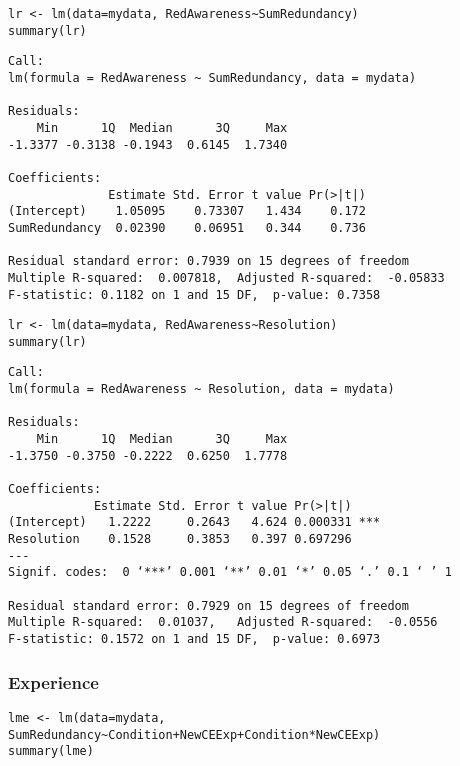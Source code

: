 \documentclass[10pt]{article}
\begin{document}
\begin{verbatim}
lr <- lm(data=mydata, RedAwareness~SumRedundancy)
summary(lr)
\end{verbatim}

\begin{verbatim}
Call:
lm(formula = RedAwareness ~ SumRedundancy, data = mydata)

Residuals:
    Min      1Q  Median      3Q     Max 
-1.3377 -0.3138 -0.1943  0.6145  1.7340 

Coefficients:
              Estimate Std. Error t value Pr(>|t|)
(Intercept)    1.05095    0.73307   1.434    0.172
SumRedundancy  0.02390    0.06951   0.344    0.736

Residual standard error: 0.7939 on 15 degrees of freedom
Multiple R-squared:  0.007818,	Adjusted R-squared:  -0.05833 
F-statistic: 0.1182 on 1 and 15 DF,  p-value: 0.7358
\end{verbatim}

\begin{verbatim}
lr <- lm(data=mydata, RedAwareness~Resolution)
summary(lr)
\end{verbatim}

\begin{verbatim}
Call:
lm(formula = RedAwareness ~ Resolution, data = mydata)

Residuals:
    Min      1Q  Median      3Q     Max 
-1.3750 -0.3750 -0.2222  0.6250  1.7778 

Coefficients:
            Estimate Std. Error t value Pr(>|t|)    
(Intercept)   1.2222     0.2643   4.624 0.000331 ***
Resolution    0.1528     0.3853   0.397 0.697296    
---
Signif. codes:  0 ‘***’ 0.001 ‘**’ 0.01 ‘*’ 0.05 ‘.’ 0.1 ‘ ’ 1

Residual standard error: 0.7929 on 15 degrees of freedom
Multiple R-squared:  0.01037,	Adjusted R-squared:  -0.0556 
F-statistic: 0.1572 on 1 and 15 DF,  p-value: 0.6973
\end{verbatim}


\subsubsection{Experience}
\label{sec-2-4-2}

\begin{verbatim}
lme <- lm(data=mydata, SumRedundancy~Condition+NewCEExp+Condition*NewCEExp)
summary(lme)
\end{verbatim}
\end{document}
